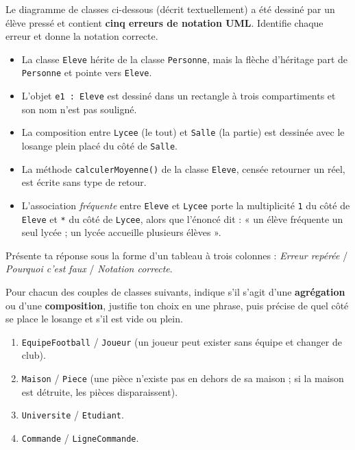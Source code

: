 \documentclass[11pt]{article}
\begin{document}
\begin{exercice}
Le diagramme de classes ci-dessous (décrit textuellement) a été dessiné par un élève pressé et contient \textbf{cinq erreurs de notation UML}. Identifie chaque erreur et donne la notation correcte.
\begin{itemize}
  \item La classe \texttt{Eleve} hérite de la classe \texttt{Personne}, mais la flèche d'héritage part de \texttt{Personne} et pointe vers \texttt{Eleve}.
  \item L'objet \texttt{e1 : Eleve} est dessiné dans un rectangle à trois compartiments et son nom n'est pas souligné.
  \item La composition entre \texttt{Lycee} (le tout) et \texttt{Salle} (la partie) est dessinée avec le losange plein placé du côté de \texttt{Salle}.
  \item La méthode \texttt{calculerMoyenne()} de la classe \texttt{Eleve}, censée retourner un réel, est écrite sans type de retour.
  \item L'association \emph{fréquente} entre \texttt{Eleve} et \texttt{Lycee} porte la multiplicité \texttt{1} du côté de \texttt{Eleve} et \texttt{*} du côté de \texttt{Lycee}, alors que l'énoncé dit : « un élève fréquente un seul lycée ; un lycée accueille plusieurs élèves ».
\end{itemize}
Présente ta réponse sous la forme d'un tableau à trois colonnes : \emph{Erreur repérée} / \emph{Pourquoi c'est faux} / \emph{Notation correcte}.
\end{exercice}

\begin{exercice}
Pour chacun des couples de classes suivants, indique s'il s'agit d'une \textbf{agrégation} ou d'une \textbf{composition}, justifie ton choix en une phrase, puis précise de quel côté se place le losange et s'il est vide ou plein.
\begin{enumerate}
  \item \texttt{EquipeFootball} / \texttt{Joueur} (un joueur peut exister sans équipe et changer de club).
  \item \texttt{Maison} / \texttt{Piece} (une pièce n'existe pas en dehors de sa maison ; si la maison est détruite, les pièces disparaissent).
  \item \texttt{Universite} / \texttt{Etudiant}.
  \item \texttt{Commande} / \texttt{LigneCommande}.
\end{enumerate}
\end{exercice}
\end{document}
